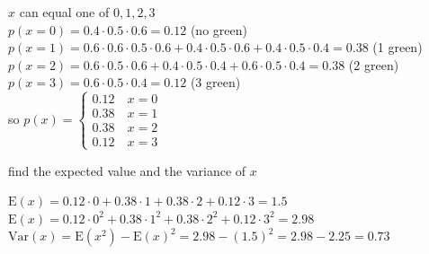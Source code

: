\documentclass[11pt]{article}
\begin{document}
\begin{definition}
\begin{my_example}
\begin{subquestion}
\begin{answer}
\(x\) can equal one of \(0,1,2,3\)\\[0pt]
\(p(x=0)=0.4 \cdot 0.5 \cdot 0.6 = 0.12\) (no green)\\[0pt]
\(p(x=1)=0.6 \cdot 0.6 \cdot 0.5 \cdot 0.6 + 0.4 \cdot 0.5 \cdot 0.6 + 0.4 \cdot 0.5 \cdot 0.4 = 0.38\) (1 green)\\[0pt]
\(p(x=2)=0.6 \cdot 0.5 \cdot 0.6 + 0.4 \cdot 0.5 \cdot 0.4 + 0.6 \cdot 0.5 \cdot 0.4 = 0.38\) (2 green)\\[0pt]
\(p(x=3)=0.6 \cdot 0.5 \cdot 0.4 = 0.12\) (3 green)\\[0pt]
so \(p(x) = \begin{cases} 0.12 \quad x=0\\ 0.38 \quad x=1\\ 0.38 \quad x=2\\ 0.12 \quad x=3 \end{cases}\)\\[0pt]
\end{answer}
\end{subquestion}
\begin{subquestion}
find the expected value and the variance of \(x\)\\[0pt]
\begin{answer}
\(\mathrm{E}(x)=0.12 \cdot 0 + 0.38 \cdot 1 + 0.38 \cdot 2 + 0.12 \cdot 3 = 1.5\)\\[0pt]
\(\mathrm{E}(x)=0.12 \cdot 0^2 + 0.38 \cdot 1^2 + 0.38 \cdot 2^2 + 0.12 \cdot 3^2 = 2.98\)\\[0pt]
\(\mathrm{Var}(x)=\mathrm{E}(x^2)-\mathrm{E}(x)^2=2.98-(1.5)^2=2.98-2.25=0.73\)\\[0pt]
\end{answer}
\end{subquestion}
\end{my_example}
\end{definition}
\end{document}
